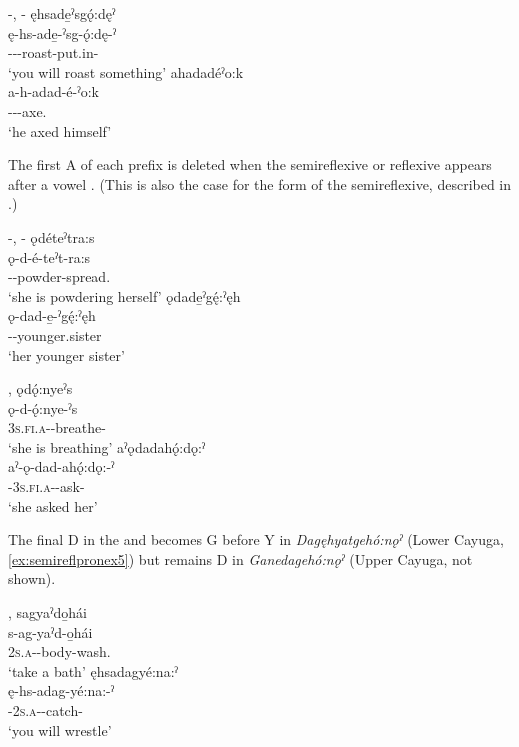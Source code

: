 \ea\label{ex:semireflpronex2}  {\semireflexive}-{\joinerE},  \textsc{-\joinerE}
\ea ęhsade̱ˀsgǫ́:dęˀ\\
\gll ę-hs-ade̱-ˀsg-ǫ́:dę-ˀ\\
 \fut--{\joinerE}-roast-put.in-{\punctual}\\
\glt `you will roast something'
\ex ahadadéˀo:k\\
\gll a-h-adad-é-ˀo:k\\
 {\factual}--{\joinerE}-axe.{\zeropunctual}\\
\glt `he axed himself'
\z
\z

The first A of each prefix is deleted when the semireflexive or reflexive appears after a vowel . (This is also the case for the  form of the semireflexive, described in .)

\ea\label{ex:semireflpronex3}  {\semireflexive}-{\joinerE},  \textsc{-\joinerE}
\ea ǫdéteˀtra:s\\
\gll ǫ-d-é-teˀt-ra:s\\
-{\joinerE}-powder-spread.{\zeropunctual}\\
\glt `she is powdering herself'
\ex ǫdade̱ˀgę́:ˀęh\\
\gll ǫ-dad-e̱-ˀgę́:ˀęh\\
-{\joinerE}-younger.sister\\
\glt `her younger sister'
\z
\z

\ea\label{ex:semireflpronex4}  {\semireflexive},  {}
\ea ǫdǫ́:nyeˀs\\
\gll ǫ-d-ǫ́:nye-ˀs\\
\textsc{3s.fi.a}-{\semireflexive}-breathe-{\habitual}\\
\glt `she is breathing'
\ex aˀǫdadahǫ́:dǫ:ˀ\\
\gll aˀ-ǫ-dad-ahǫ́:dǫ:-ˀ\\
 {\factual}-\textsc{3s.fi.a}-{}-ask-{\punctual}\\
\glt `she asked her'
\z
\z

The final D in the  {\semireflexive} and  {} becomes G before Y in \textit{Dagęhyatgehó:nǫˀ} (Lower Cayuga, \ref{ex:semireflpronex5}) but remains D in \textit{Ganedagehó:nǫˀ} (Upper Cayuga, not shown).

\ea\label{ex:semireflpronex5}   {\semireflexive},  {}
\ea sagyaˀdo̱hái\\
\gll s-ag-yaˀd-o̱hái\\
 \textsc{2s.a}-{}-body-wash.{\noaspect} \\
\glt `take a bath'
\ex ęhsadagyé:na:ˀ\\
\gll ę-hs-adag-yé:na:-ˀ\\
 \fut-\textsc{2s.a}-{}-catch-{\punctual}\\
\glt `you will wrestle'
\z
\z

